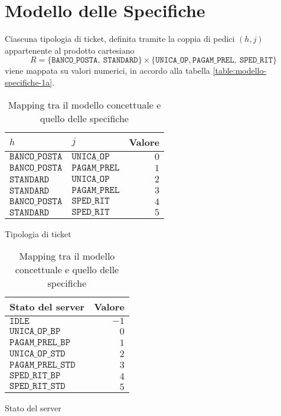 \chapter{Modello delle Specifiche}\label{chp:modello-specifiche}
Ciascuna tipologia di ticket, definita tramite la coppia di pedici $(h,j)$ appartenente al prodotto cartesiano 
\begin{equation}
R = \lbrace \mathtt{BANCO\_POSTA},\ \mathtt{STANDARD}\rbrace \times \lbrace \mathtt{UNICA\_OP},\mathtt{PAGAM\_PREL},\ \mathtt{SPED\_RIT} \rbrace
\end{equation}
viene mappata su valori numerici, in accordo alla tabella \ref{table:modello-specifiche-1a}.

\begin{table}[ht]
\centering
\begin{subtable}{0.5\textwidth}
\centering
{\tablecolors
\begin{tabular}{| l | l | r |}
\hline
$h$ & $j$ & Valore\\
\hline
$\mathtt{BANCO\_POSTA}$ & $\mathtt{UNICA\_OP}$ & $0$\\
\hline
$\mathtt{BANCO\_POSTA}$ & $\mathtt{PAGAM\_PREL}$ & $1$\\
\hline
$\mathtt{STANDARD}$ & $\mathtt{UNICA\_OP}$ & $2$\\
\hline
$\mathtt{STANDARD}$ & $\mathtt{PAGAM\_PREL}$ & $3$\\
\hline
$\mathtt{BANCO\_POSTA}$ & $\mathtt{SPED\_RIT}$ & $4$\\
\hline
$\mathtt{STANDARD}$ & $\mathtt{SPED\_RIT}$ & $5$\\
\hline
\end{tabular}}
\caption{Tipologia di ticket}
\label{table:modello-specifiche-1a}
\end{subtable}%
\begin{subtable}{0.5\textwidth}
\centering
{\tablecolors
\begin{tabular}{| l | r |}
\hline
Stato del server & Valore\\
\hline
$\mathtt{IDLE}$ & $-1$\\
\hline
$\mathtt{UNICA\_OP\_BP}$ & $0$\\
\hline
$\mathtt{PAGAM\_PREL\_BP}$ & $1$\\
\hline
$\mathtt{UNICA\_OP\_STD}$ & $2$\\
\hline
$\mathtt{PAGAM\_PREL\_STD}$ & $3$\\
\hline
$\mathtt{SPED\_RIT\_BP}$ & $4$\\
\hline
$\mathtt{SPED\_RIT\_STD}$ & $5$\\
\hline
\end{tabular}}
\caption{Stato del server}
\label{table:modello-specifiche-1b}
\end{subtable}
\caption{Mapping tra il modello concettuale e quello delle specifiche}
\label{table:modello-specifiche-1}
\end{table}


